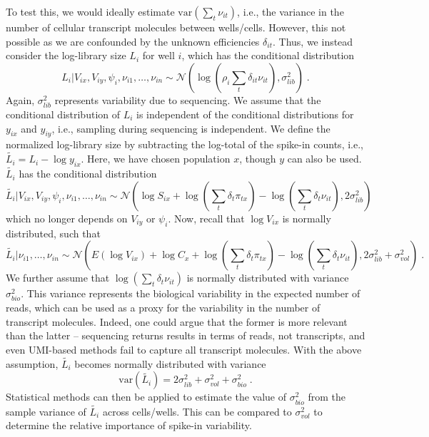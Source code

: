 \documentclass{article}
\begin{document}
To test this, we would ideally estimate $\mbox{var}(\sum_t \nu_{it})$, i.e., the variance in the number of cellular transcript molecules between wells/cells.
However, this not possible as we are confounded by the unknown efficiencies $\delta_{it}$. 
Thus, we instead consider the log-library size $L_i$ for well $i$, which has the conditional distribution
\[
L_i | V_{ix}, V_{iy}, \psi_i, \nu_{i1}, \ldots, \nu_{in} \sim \mathcal{N}(\log ( \rho_i \textstyle\sum_t \delta_{it} \nu_{it}), \sigma^2_{lib}) \;.
\]
Again, $\sigma^2_{lib}$ represents variability due to sequencing.
We assume that the conditional distribution of $L_i$ is independent of the conditional distributions for $y_{ix}$ and $y_{iy}$, i.e., sampling during sequencing is independent.
We define the normalized log-library size by subtracting the log-total of the spike-in counts, i.e., $\tilde{L_i} = L_i - \log y_{ix}$.
Here, we have chosen population $x$, though $y$ can also be used.
$\tilde{L_i}$ has the conditional distribution
\[
\tilde{L_i} | V_{ix}, V_{iy}, \psi_i, \nu_{i1}, \ldots, \nu_{in} \sim \mathcal{N}( \log S_{ix} + \log(\textstyle\sum_t \delta_t \pi_{tx}) - \log(\textstyle\sum_t \delta_t \nu_{it}), 2\sigma^2_{lib})
\]
which no longer depends on $V_{iy}$ or $\psi_i$.
Now, recall that $\log V_{ix}$ is normally distributed, such that 
\[
\tilde{L_i} | \nu_{i1}, \ldots, \nu_{in} \sim \mathcal{N}( E(\log V_{ix}) + \log C_{x} + \log(\textstyle\sum_t \delta_t \pi_{tx}) - \log(\textstyle\sum_t \delta_t \nu_{it}), 2\sigma^2_{lib} + \sigma^2_{vol}) \;.
\]
We further assume that $\log(\textstyle\sum_t \delta_t \nu_{it})$ is normally distributed with variance $\sigma^2_{bio}$.
This variance represents the biological variability in the expected number of reads, which can be used as a proxy for the variability in the number of transcript molecules.
Indeed, one could argue that the former is more relevant than the latter --  sequencing returns results in terms of reads, not transcripts, and even UMI-based methods fail to capture all transcript molecules.
With the above assumption, $\tilde{L_i}$ becomes normally distributed with variance
\[
\mbox{var}(\tilde{L_i}) = 2\sigma^2_{lib} + \sigma^2_{vol} + \sigma^2_{bio} \;.
\]
Statistical methods can then be applied to estimate the value of $\sigma^2_{bio}$ from the sample variance of $\tilde{L_i}$ across cells/wells.
This can be compared to $\sigma^2_{vol}$ to determine the relative importance of spike-in variability.

\end{document}
